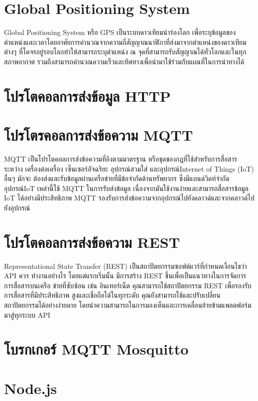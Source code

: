 \section{Global Positioning System}
  Global Positioning System หรือ GPS เป็นระบบดาวเทียมนำร่องโลก เพื่อระบุข้อมูลของตำแหน่งและเวลาโดยอาศัยการคำนวณจากความถี่สัญญาณนาฬิกาที่ส่งมาจากตำแหน่งของดาวเทียมต่างๆ ที่โคจรอยู่รอบโลกทำให้สามารถระบุตำแหน่ง ณ จุดที่สามารถรับสัญญาณได้ทั่วโลกและในทุกสภาพอากาศ รวมถึงสามารถคำนวณความเร็วและทิศทางเพื่อนำมาใช้ร่วมกับแผนที่ในการนำทางได้

\section{โปรโตคอลการส่งข้อมูล HTTP}

\section{โปรโตรคอลการส่งข้อความ MQTT}
  MQTT เป็นโปรโตคอลการส่งข้อความที่อิงตามมาตรฐาน หรือชุดของกฎที่ใช้สําหรับการสื่อสารระหว่าง เครื่องต่อเครื่อง เซ็นเซอร์อัจฉริยะ อุปกรณ์สวมใส่ และอุปกรณ์Internet of Things (IoT) อื่นๆ มักจะ ต้องส่งและรับข้อมูลผ่านเครือข่ายที่มีข้อจํากัดด้านทรัพยากร ซึ่งมีแบนด์วิดท์จํากัด อุปกรณ์IoT เหล่านี้ใช้ MQTT ในการรับส่งข้อมูล เนื่องจากมันใช้งานง่ายและสามารถสื่อสารข้อมูล IoT ได้อย่างมีประสิทธิภาพ MQTT รองรับการส่งข้อความจากอุปกรณ์ไปยังคลาวด์และจากคลาวด์ไปยังอุปกรณ์

\section{โปรโตคอลการส่งข้อความ REST}
  Representational State Transfer (REST) เป็นสถาปัตยกรรมซอฟต์แวร์ที่กําหนดเงื่อนไขว่า API ควร ทํางานอย่างไร โดยแต่แรกเริ่มนั้น มีการสร้าง REST ขึ้นเพื่อเป็นแนวทางในการจัดการการสื่อสารบนเครือ ข่ายที่ซับซ้อน เช่น อินเทอร์เน็ต คุณสามารถใช้สถาปัตยกรรม REST เพื่อรองรับการสื่อสารที่มีประสิทธิภาพ สูงและเชื่อถือได้ในทุกระดับ คุณยังสามารถใช้และปรับเปลี่ยนสถาปัตยกรรมได้อย่างง่ายดาย โดยนําความสามารถในการมองเห็นและการเคลื่อนย้ายข้ามแพลตฟอร์มมาสู่ทุกระบบ API

\section{โบรกเกอร์ MQTT Mosquitto}

\section{Node.js}

